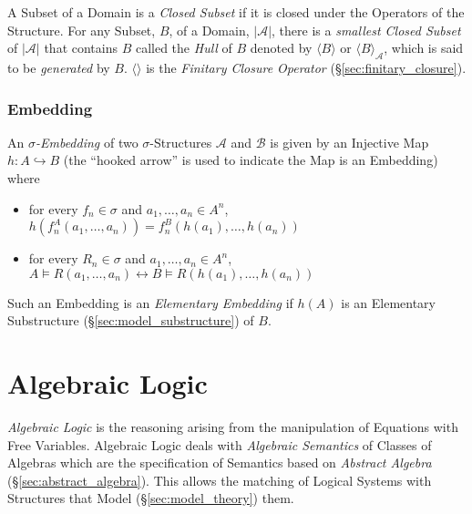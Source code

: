 A Subset of a Domain is a \emph{Closed Subset} if it is closed under
the Operators of the Structure. For any Subset, $B$, of a Domain,
$|\mathcal{A}|$, there is a \emph{smallest Closed Subset} of
$|\mathcal{A}|$ that contains $B$ called the \emph{Hull} of $B$
denoted by $\langle B \rangle$ or $\langle B \rangle_{\mathcal{A}}$,
which is said to be \emph{generated} by $B$. $\langle \rangle$ is the
\emph{Finitary Closure Operator} (\S\ref{sec:finitary_closure}).



\subsubsection{Embedding}\label{sec:sigma_embedding}


An \emph{$\sigma$-Embedding} of two $\sigma$-Structures $\mathcal{A}$
and $\mathcal{B}$ is given by an Injective Map $h: A \hookrightarrow
B$ (the ``hooked arrow'' is used to indicate the Map is an Embedding)
where
\begin{itemize}
\item for every $f_n \in \sigma$ and $a_1, \ldots, a_n \in A^n$,
  $h(f_{n}^A(a_1,\ldots,a_n)) = f_{n}^B(h(a_1),\ldots,h(a_n))$
\item for every $R_n \in \sigma$ and $a_1, \ldots, a_n \in A^n$, $A
  \vDash R(a_1, \ldots, a_n) \leftrightarrow B \vDash R(h(a_1),
  \ldots, h(a_n))$
\end{itemize}
Such an Embedding is an \emph{Elementary Embedding} if $h(A)$ is an
Elementary Substructure (\S\ref{sec:model_substructure}) of $B$.



\section{Algebraic Logic}

\emph{Algebraic Logic} is the reasoning arising from the manipulation
of Equations with Free Variables. Algebraic Logic deals with
\emph{Algebraic Semantics} of Classes of Algebras which are the
specification of Semantics based on \emph{Abstract Algebra}
(\S\ref{sec:abstract_algebra}). This allows the matching of Logical
Systems with Structures that Model (\S\ref{sec:model_theory}) them.


